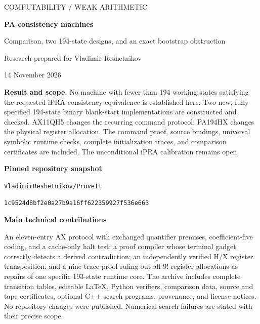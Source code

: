 \documentclass[11pt]{article}
\begin{document}
\begin{titlepage}
\vspace*{0.7cm}
{\color{ink}\large COMPUTABILITY / WEAK ARITHMETIC}\par
\vspace{0.7cm}
{\Huge\bfseries PA consistency machines}\par
\vspace{0.4cm}
{\Large Comparison, two 194-state designs, and an exact bootstrap obstruction}\par
\vspace{0.7cm}
{\large Research prepared for Vladimir Reshetnikov}\par
14 November 2026\par
\vspace{0.8cm}
\colorbox{light}{\parbox{0.94\linewidth}{\textbf{Result and scope.}
No machine with fewer than 194 working states satisfying the requested
iPRA consistency equivalence is established here. Two new, fully specified
194-state binary blank-start implementations are constructed and checked.
AX11QH5 changes the recurring command protocol; PA194HX changes the physical
register allocation. The command proof, source bindings, universal symbolic
runtime checks, complete initialization traces, and comparison certificates
are included. The unconditional iPRA calibration remains open.}}
\vspace{0.7cm}
\textbf{Pinned repository snapshot}\par
\nolinkurl{VladimirReshetnikov/ProveIt}\par
\nolinkurl{1c9524d8bf2e0a27b9a16ff622359927f536e663}\par
\vspace{0.7cm}
\textbf{Main technical contributions}\par
An eleven-entry AX protocol with exchanged quantifier premises,
coefficient-five coding, and a cache-only halt test; a proof compiler whose
terminal gadget correctly detects a derived contradiction; an independently
verified H/X register transposition; and a nine-trace proof ruling out all
$9!$ register allocations as repairs of one specific 193-state runtime core.
\vfill
\small The archive includes complete transition tables, editable LaTeX,
Python verifiers, comparison data, source and tape certificates, optional
C++ search programs, provenance, and license notices. No repository changes
were published. Numerical search failures are stated with their precise scope.
\end{titlepage}
\end{document}
